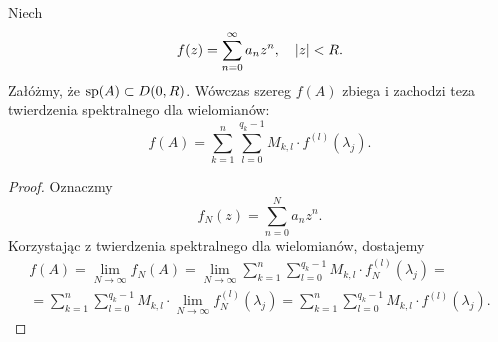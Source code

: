 %
\begin{theorem}
  Niech
%
  \begin{equation*}
    f(z) = \sum_{n=0}^{\infty} a_n z^n, \quad \lvert z\rvert < R.
  \end{equation*}
%
  Załóżmy, że $\operatorname{sp}(A) \subset D(0,R)$. Wówczas szereg $f(A)$ zbiega i zachodzi teza twierdzenia spektralnego dla 
  wielomianów:
%
  \begin{equation*}
    f(A) = \sum_{k=1}^{n} \sum_{l=0}^{q_k-1} M_{k,l} \cdot f^{(l)}(\lambda_j).
  \end{equation*}
\end{theorem}
%
\begin{proof}
  Oznaczmy
%
  \begin{equation*}
    f_N(z) = \sum_{n=0}^N a_n z^n.
  \end{equation*}
%
  Korzystając z twierdzenia spektralnego dla wielomianów, dostajemy
%
  \begin{multline*}
    f(A) = \lim_{N\to\infty} f_N(A) 
    = \lim_{N\to\infty} \sum_{k=1}^{n} \sum_{l=0}^{q_k-1} M_{k,l} \cdot f_N^{(l)}(\lambda_j) = \\
    = \sum_{k=1}^{n} \sum_{l=0}^{q_k-1} M_{k,l} \cdot \lim_{N\to\infty} f_N^{(l)}(\lambda_j)
    = \sum_{k=1}^{n} \sum_{l=0}^{q_k-1} M_{k,l} \cdot f^{(l)}(\lambda_j). \tag*{\qedhere}
  \end{multline*}
\end{proof}
































